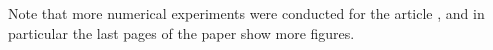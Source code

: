 Note that more numerical experiments were conducted for the article \cite{Besson2018ALT}, and in particular the last pages of the paper show more figures.

